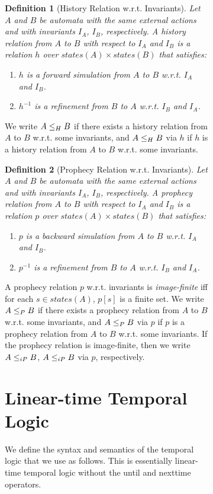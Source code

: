 \documentclass[11pt]{article}
\newcommand{\bn}{\begin{enumerate}}
\newcommand{\en}{\end{enumerate}}
\newcommand{\bd}{\begin{definition}}
\newcommand{\ed}{\end{definition}}
\newcommand{\intrdef}{\emph}	\newcommand{\intr}{\emph}
\newcommand{\states}{\mathit{states}}
\newtheorem{definition}{Definition}
\begin{document}
\begin{figure}[htb]
\begin{figure}[htb]
\bd[History Relation w.r.t. Invariants]
Let $A$ and $B$ be automata with the same external actions and with
invariants $I_A$, $I_B$, respectively. A \intrdef{history relation}
from $A$ to $B$ with respect to $I_A$ and $I_B$
is a relation $h$ over $\states(A) \times \states(B)$
that satisfies:
\bn

\item \label{clause:hist-inv:init}
$h$ is a forward simulation from $A$ to $B$ w.r.t. $I_A$ and $I_B$.

\item \label{clause:hist-inv:trans}
$h^{-1}$ is a refinement from $B$ to $A$ w.r.t. $I_B$ and $I_A$.

\en
\label{def:hist-inv}
\ed
We write $A \leq_H B$ if there exists a history relation from $A$
to $B$ w.r.t. some invariants, and 
$A \leq_H B$ via $h$ if $h$ is a history relation from
$A$ to $B$ w.r.t. some invariants.



\bd[Prophecy Relation w.r.t. Invariants]
Let $A$ and $B$ be automata with the same external actions and with
invariants $I_A$, $I_B$, respectively. A \intrdef{prophecy relation}
from $A$ to $B$ with respect to $I_A$ and $I_B$
is a relation $p$ over $\states(A) \times \states(B)$
that satisfies:
\bn

\item \label{clause:proph-inv:init}
$p$ is a backward simulation from $A$ to $B$ w.r.t. $I_A$ and $I_B$.

\item \label{clause:proph-inv:trans}
$p^{-1}$ is a refinement from $B$ to $A$ w.r.t. $I_B$ and $I_A$.

\en
\label{def:proph-inv}
\ed
A prophecy relation $p$ w.r.t. invariants is \intr{image-finite} iff
for each $s \in \states(A)$, $p[s]$ is a finite set.
We write $A \leq_P B$ if there exists a prophecy relation from $A$
to $B$ w.r.t. some invariants, and 
$A \leq_P B$ via $p$ if $p$ is a prophecy relation from
$A$ to $B$ w.r.t. some invariants.
If the prophecy relation is image-finite, then we write 
$A \leq_{iP} B$, $A \leq_{iP} B$ via $p$, respectively.





\newpage
\section{Linear-time Temporal Logic}
\label{app:TL}

We define the syntax and semantics of the temporal logic that we use as
follows. This is essentially linear-time temporal logic
without the until and nexttime operators.



\end{figure}
\end{figure}
\end{document}
